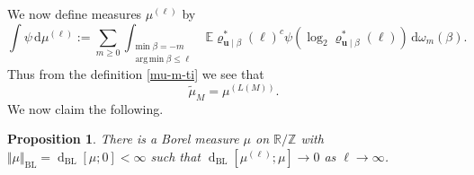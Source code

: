 \documentclass[11pt,reqno]{amsart}
\DeclareMathOperator*{\argmin}{arg\,min}
\numberwithin{equation}{section}
\newtheorem{proposition}[theorem]{Proposition}
\theoremstyle{definition}
\theoremstyle{remark}
\newcommand{\mb}{\mathbb}
\newcommand{\mbf}{\mathbf}
\newcommand{\dist}[2]{{\operatorname{d}_{\operatorname{BL}}[#1;#2]}}
\def\BL{\operatorname{BL}}
\renewcommand{\le}{\leqslant}
\renewcommand{\ge}{\geqslant}
\newcommand\Z{\mathbb{Z}}
\newcommand\R{\mathbb{R}}
\begin{document}
We now define measures $\mu^{(\ell)}$ by
\begin{equation}\label{mu-ell-def} \int \psi \, \mathrm{d} \mu^{(\ell)} := \sum_{m \ge 0}\int_{\substack{\min \beta = -m \\ \argmin \beta \le \ell}} \mb{E} \varrho^*_{\mbf{u} \mid \beta}(\ell)^c \psi (\log_2 \varrho^*_{\mbf{u} \mid \beta}(\ell)) \, \mathrm{d}\omega_m(\beta).\end{equation}
Thus from the definition \cref{mu-m-ti} we see that
\begin{equation}\label{mu-ell-mu-m} \tilde\mu_M = \mu^{(L(M))}.\end{equation}
We now claim the following.
\begin{proposition}\label{prop124}
There is a Borel measure $\mu$ on $\R/\Z$ with $\Vert \mu \Vert_{\BL} = \dist{\mu}{0} < \infty$ such that $\dist{\mu^{(\ell)}}{\mu} \rightarrow 0$ as $\ell \rightarrow \infty$.   
\end{proposition}
\end{document}
